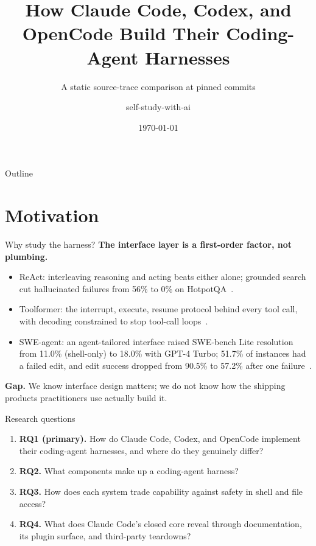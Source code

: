 \documentclass[aspectratio=169,11pt]{beamer}
\title[Coding-agent harnesses in three products]{How Claude Code, Codex, and OpenCode Build Their Coding-Agent Harnesses}
\subtitle{A static source-trace comparison at pinned commits}
\author[self-study-with-ai]{self-study-with-ai}
\date{\today}
\newcommand{\codex}[0]{Codex}
\newcommand{\occ}[0]{OpenCode}
\newcommand{\ccc}[0]{Claude Code}
\begin{document}
\begin{frame}
  \titlepage
\end{frame}

\begin{frame}{Outline}
  \tableofcontents
\end{frame}

\section{Motivation}

\begin{frame}{Why study the harness?}
  \textbf{The interface layer is a first-order factor, not plumbing.}
  \begin{itemize}
    \item ReAct: interleaving reasoning and acting beats either alone;
      grounded search cut hallucinated failures from 56\% to 0\% on
      HotpotQA~\citep{yao2023react}.
    \item Toolformer: the interrupt, execute, resume protocol behind every
      tool call, with decoding constrained to stop tool-call
      loops~\citep{schick2023toolformer}.
    \item SWE-agent: an agent-tailored interface raised SWE-bench Lite
      resolution from 11.0\% (shell-only) to 18.0\% with GPT-4 Turbo;
      51.7\% of instances had a failed edit, and edit success dropped from
      90.5\% to 57.2\% after one failure~\citep{yang2024sweagent}.
  \end{itemize}
  \textbf{Gap.} We know interface design matters; we do not know how the
  shipping products practitioners use actually build it.
\end{frame}

\begin{frame}{Research questions}
  \begin{enumerate}
    \item \textbf{RQ1 (primary).} How do \ccc{}, \codex{}, and \occ{}
      implement their coding-agent harnesses, and where do they genuinely
      differ?
    \item \textbf{RQ2.} What components make up a coding-agent harness?
    \item \textbf{RQ3.} How does each system trade capability against
      safety in shell and file access?
    \item \textbf{RQ4.} What does \ccc{}'s closed core reveal through
      documentation, its plugin surface, and third-party teardowns?
  \end{enumerate}
\end{frame}
\end{document}
